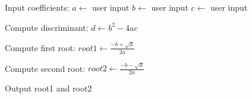 \begin{algorithm}
\caption{Find Roots of a Quadratic Equation}
\begin{algorithmic}[1]

\STATE Input coefficients:
\STATE $a \gets$ user input
\STATE $b \gets$ user input
\STATE $c \gets$ user input

\STATE Compute discriminant:
\STATE $d \gets b^2 - 4ac$

\STATE Compute first root:
\STATE $root1 \gets \frac{-b + \sqrt{d}}{2a}$

\STATE Compute second root:
\STATE $root2 \gets \frac{-b - \sqrt{d}}{2a}$

\STATE Output root1 and root2

\end{algorithmic}
\end{algorithm}